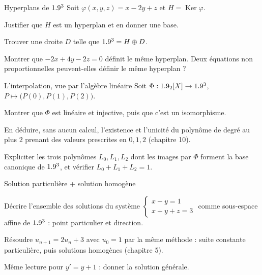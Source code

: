 \begin{exercice}[2]{Hyperplans de $1.9^{3}$}
Soit $\varphi(x,y,z)=x-2y+z$ et $H=\operatorname{Ker}\varphi$.
\begin{questions}
  \item Justifier que $H$ est un hyperplan et en donner une base.
  \item Trouver une droite $D$ telle que $1.9^{3}=H\oplus D$.
  \item Montrer que $-2x+4y-2z=0$ définit le même hyperplan. Deux équations
    non proportionnelles peuvent-elles définir le même hyperplan ?
\end{questions}
\end{exercice}

\begin{exercice}[2]{L'interpolation, vue par l'algèbre linéaire}
Soit $\Phi:1.9_2[X]\to1.9^{3}$, $P\mapsto\bigl(P(0),P(1),P(2)\bigr)$.
\begin{questions}
  \item Montrer que $\Phi$ est linéaire et injective, puis que c'est un
    isomorphisme.
  \item En déduire, sans aucun calcul, l'existence et l'unicité du polynôme
    de degré au plus $2$ prenant des valeurs prescrites en $0,1,2$
    (chapitre 10).
  \item Expliciter les trois polynômes $L_0,L_1,L_2$ dont les images par
    $\Phi$ forment la base canonique de $1.9^{3}$, et vérifier
    $L_0+L_1+L_2=1$.
\end{questions}
\end{exercice}

\begin{exercice}[2]{Solution particulière + solution homogène}
\begin{questions}
  \item Décrire l'ensemble des solutions du système
    $\begin{cases}x-y=1\\x+y+z=3\end{cases}$ comme sous-espace affine de
    $1.9^{3}$ : point particulier et direction.
  \item Résoudre $u_{n+1}=2u_n+3$ avec $u_0=1$ par la même méthode :
    suite constante particulière, puis solutions homogènes (chapitre 5).
  \item Même lecture pour $y'=y+1$ : donner la solution générale.
\end{questions}
\end{exercice}


